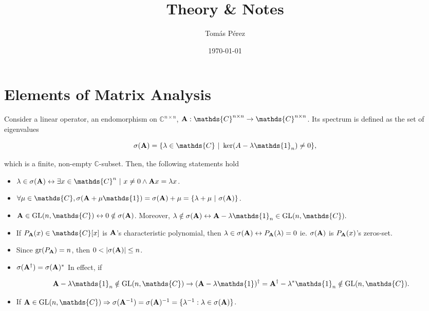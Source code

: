\documentclass{homework}
\author{Tomás Pérez}
\date{\today}
\title{Theory \& Notes}
\begin{document}
 \maketitle

\section{Elements of Matrix Analysis}

Consider a linear operator, an endomorphism on $\mathds{C}^{n \times n}$, ${\bf A}: \mathds{C}^{n \times n} \rightarrow \mathds{C}^{n \times n}$. Its spectrum is defined as the set of eigenvalues 

$$
  \sigma({\bf A}) = \{\lambda \in \mathds{C} \blanky | \blanky \ker(A - \lambda \mathds{1}_n) \neq {0}\}, 
$$

which is a finite, non-empty $\mathds{C}$-subset. Then, the following statements hold

\begin{itemize}
    \item $\lambda \in \sigma({\bf A}) \leftrightarrow \exists x \in \mathds{C}^n \blanky | \blanky x \neq 0 \land {\bf A}x = \lambda x$.
    \item $\forall \mu \in \mathds{C}, \sigma({\bf A}+\mu \mathds{1}) = \sigma({\bf A}) + \mu = \{\lambda + \mu \blanky | \blanky \sigma({\bf A})\}$.
    \item ${\bf A} \in \textnormal{GL}(n, \mathds{C}) \leftrightarrow 0 \notin \sigma({\bf A})$. Moreover, $\lambda \notin \sigma({\bf A}) \leftrightarrow {\bf A}-\lambda \mathds{1}_n \in \textnormal{GL}(n, \mathds{C}).$
    \item If $P_{{\bf A}}(x) \in \mathds{C}[x]$ is ${\bf A}$'s characteristic polynomial, then $\lambda \in \sigma({\bf A}) \leftrightarrow P_{{\bf A}}(\lambda) = 0$ ie. $\sigma({\bf A})$ is $P_{\bf A}(x)$'s zeros-set. 
    \item Since $\textnormal{gr}(P_{{\bf A}})=n$, then $0 < |\sigma({\bf A})| \leq n$. 
    \item $\sigma({\bf A}^\dagger) = \sigma({\bf A})^{*}$ In effect, if 
    
    \begin{equation*}
        {\bf A} - \lambda \mathds{1}_n \notin \textnormal{GL}(n,\mathds{C}) \rightarrow ({\bf A}-\lambda \mathds{1})^{\dagger} = {\bf A}^\dagger - \lambda^{*} \mathds{1}_n  \notin \textnormal{GL}(n,\mathds{C}).
    \end{equation*}
    
    \item If ${\bf A} \in \textnormal{GL}(n,\mathds{C}) \Rightarrow \sigma({\bf A}^{-1}) = \sigma({\bf A})^{-1} = \{\lambda^{-1} : \lambda \in \sigma({\bf A})\}$. \\
\end{itemize}
\end{document}
